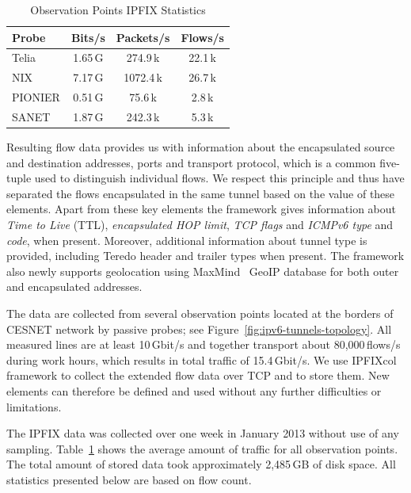\begin{table}[!tb]
\centering
        \begin{tabular}{lccc}
        \textbf{Probe} & \textbf{Bits/s} & \textbf{Packets/s} & \textbf{Flows/s} \\ \toprule 
        Telia & 1.65\,G & 274.9\,k & 22.1\,k \\
        NIX & 7.17\,G & 1072.4\,k & 26.7\,k \\
        PIONIER & 0.51\,G & 75.6\,k & 2.8\,k \\
        SANET & 1.87\,G & 242.3\,k & 5.3\,k \\ \bottomrule
        \end{tabular}
        \caption{Observation Points IPFIX Statistics}
        \label{tab:ipv6-tunnels-collected-data}
\end{table}

Resulting flow data provides us with information about the encapsulated source and destination addresses, ports and transport protocol, which is a common five-tuple used to distinguish individual flows. We respect this principle and thus have separated the flows encapsulated in the same tunnel based on the value of these elements. Apart from these key elements the framework gives information about \emph{Time to Live} (TTL), \emph{encapsulated HOP limit}, \emph{TCP flags} and \emph{ICMPv6 type} and \emph{code}, when present. Moreover, additional information about tunnel type is provided, including Teredo header and trailer types when present. The framework also newly supports geolocation using MaxMind~\cite{MaxMind-2013-MaxMind} GeoIP database for both outer and encapsulated addresses.

The data are collected from several observation points located at the borders of CESNET network by passive probes; see Figure~\ref{fig:ipv6-tunnels-topology}. All measured lines are at least 10\,Gbit/s and together transport about 80,000\,flows/s during work hours, which results in total traffic of 15.4\,Gbit/s. We use IPFIXcol~\cite{Velan-2012-Flow} framework to collect the extended flow data over TCP and to store them. New elements can therefore be defined and used without any further difficulties or limitations.

The IPFIX data was collected over one week in January 2013 without use of any sampling. Table~\ref{tab:ipv6-tunnels-collected-data} shows the average amount of traffic for all observation points. The total amount of stored data took approximately 2,485\,GB of disk space. All statistics presented below are based on flow count.

